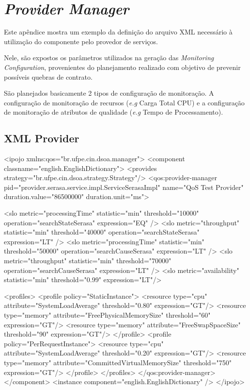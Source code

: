 \chapter{\textit{Provider Manager}}

Este apêndice mostra um exemplo da definição do arquivo XML necessário à utilização do componente pelo provedor de serviços.

Nele, são expostos os parâmetros utilizados na geração das \textit{Monitoring Configuration}, provenientes do planejamento realizado com objetivo de prevenir possíveis quebras de contrato.

São planejados basicamente 2 tipos de configuração de monitoração. A configuração de monitoração de recursos (\textit{e.g} Carga Total CPU) e a configuração de monitoração de atributos de qualidade (\textit{e.g} Tempo de Processamento).

\section{XML Provider}

\tiny
\begin{verbatimtab}[4]
<ipojo xmlns:qos="br.ufpe.cin.dsoa.manager">
	<component classname="english.EnglishDictionary">
		<provides strategy="br.ufpe.cin.dsoa.strategy.Strategy"/>
		<qos:provider-manager pid="provider.serasa.service.impl.ServiceSerasaImpl" name="QoS Test Provider"
			duration.value="86500000" duration.unit="ms">
			
			<slo metric="processingTime" statistic="min" threshold="10000"  operation="searchStateSerasa" expression="EQ" />
			<slo metric="throughput"     statistic="min" threshold="40000"  operation="searchStateSerasa" expression="LT" />
			<slo metric="processingTime" statistic="min" threshold="50000"  operation="searchCauseSerasa" expression="LT" />
			<slo metric="throughput"     statistic="min" threshold="70000"  operation="searchCauseSerasa" expression="LT" />
			<slo metric="availability"   statistic="min" threshold="0.99"   expression="LT"/>
			
			<profiles>
				<profile policy="StaticInstance">
					<resource type="cpu" 	attribute="SystemLoadAverage" threshold="0.80" expression="GT"/>
					<resource type="memory" attribute="FreePhysicalMemorySize" threshold="60" expression="GT"/>
					<resource type="memory" attribute="FreeSwapSpaceSize" threshold="90" expression="GT"/>
				</profile>
				<profile policy="PerRequestInstance">
					<resource type="cpu" 	attribute="SystemLoadAverage" threshold="0.20" expression="GT"/>
					<resource type="memory" attribute="CommittedVirtualMemorySize" threshold="750" expression="GT"/>
				</profile>
			</profiles>
		</qos:provider-manager>
	</component>
	<instance component="english.EnglishDictionary" />
</ipojo>
\end{verbatimtab}

